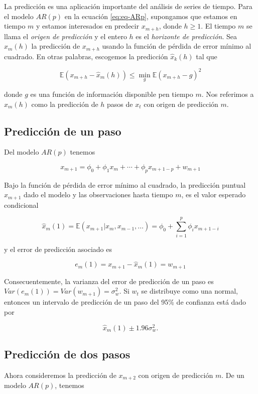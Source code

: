 \documentclass[12pt,]{krantz}
\theoremstyle{definition}
\theoremstyle{definition}
\theoremstyle{definition}
\theoremstyle{remark}
\begin{document}
La predicción es una aplicación importante del análisis de series de
tiempo. Para el modelo \(AR(p)\) en la ecuación \eqref{eq:eq-ARp},
supongamos que estamos en tiempo \(m\) y estamos interesados en predecir
\(x_{m+h}\), donde \(h\geq1\). El tiempo \(m\) se llama el \emph{origen
de predicción} y el entero \(h\) es el \emph{horizonte de predicción}.
Sea \(\hat{x}_m(h)\) la predicción de \(x_{m+h}\) usando la función de
pérdida de error mínimo al cuadrado. En otras palabras, escogemos la
predicción \(\hat{x}_k(h)\) tal que

\[\mathbb{E}(x_{m+h}-\hat{x}_m(h))\leq\min_g\mathbb{E}(x_{m+h}-g)^2\]

donde \(g\) es una función de información disponible pen tiempo \(m\).
Nos referimos a \(\hat{x}_m(h)\) como la predicción de \(h\) pasos de
\(x_t\) con origen de predicción \(m\).

\subsection{Predicción de un paso}\label{prediccion-de-un-paso}

Del modelo \(AR(p)\) tenemos

\[x_{m+1}=\phi_0+\phi_1x_m+\cdots+\phi_px_{m+1-p}+w_{m+1}\]

Bajo la función de pérdida de error mínimo al cuadrado, la predicción
puntual \(x_{m+1}\) dado el modelo y las observaciones hasta tiempo
\(m\), es el valor esperado condicional

\[\hat{x}_m(1) = \mathbb{E}(x_{m+1}|x_m,x_{m-1},\ldots) = \phi_0+\sum_{i=1}^p\phi_ix_{m+1-i}\]

y el error de predicción asociado es

\[e_m(1)=x_{m+1}-\hat{x}_m(1)=w_{m+1}\]

Consecuentemente, la varianza del error de predicción de un paso es
\(Var(e_m(1))=Var(w_{m+1})=\sigma_w^2\). Si \(w_t\) se distribuye como
una normal, entonces un intervalo de predicción de un paso del 95\% de
confianza está dado por

\[\hat{x}_m(1)\pm1.96\sigma_w^2.\]

\subsection{Predicción de dos pasos}\label{prediccion-de-dos-pasos}

Ahora consideremos la predicción de \(x_{m+2}\) con origen de predicción
\(m\). De un modelo \(AR(p)\), tenemos
\end{document}
